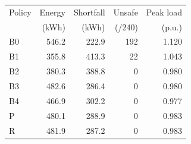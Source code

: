 \begin{tabular}{lrrrr}
\hline
Policy & Energy & Shortfall & Unsafe & Peak load \\
 & (kWh) & (kWh) & (/240) & (p.u.) \\
\hline
B0 & 546.2 & 222.9 & 192 & 1.120 \\
B1 & 355.8 & 413.3 & 22 & 1.043 \\
B2 & 380.3 & 388.8 & 0 & 0.980 \\
B3 & 482.6 & 286.4 & 0 & 0.980 \\
B4 & 466.9 & 302.2 & 0 & 0.977 \\
P & 480.1 & 288.9 & 0 & 0.983 \\
R & 481.9 & 287.2 & 0 & 0.983 \\
\hline
\end{tabular}
